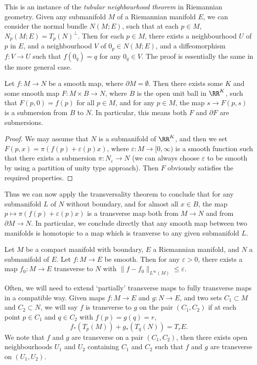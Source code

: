 \begin{remark}
    This is an instance of the \emph{tubular neighbourhood theorem} in Riemannian geometry. Given any submanifold $M$ of a Riemannian manifold $E$, we can consider the normal bundle $N(M;E)$, such that at each $p \in M$, $N_p(M;E) = T_p(N)^\perp$. Then for each $p \in M$, there exists a neighbourhood $U$ of $p$ in $E$, and a neighbourhood $V$ of $0_p \in N(M;E)$, and a diffeomorphism $f: V \to U$ such that $f(0_q) = q$ for any $0_q \in V$. The proof is essentially the same in the more general case.
\end{remark}

\begin{corollary}
    Let $f: M \to N$ be a smooth map, where $\partial M = \emptyset$. Then there exists some $K$ and some smooth map $F: M \times B \to N$, where $B$ is the open unit ball in $\RR^K$, such that $F(p,0) = f(p)$ for all $p \in M$, and for any $p \in M$, the map $s \to F(p,s)$ is a submersion from $B$ to $N$. In particular, this means both $F$ and $\partial F$ are submersions.
\end{corollary}
\begin{proof}
    We may assume that $N$ is a submanifold of $\RR^K$, and then we set $F(p,x) = \pi(f(p) + \varepsilon(p) x)$, where $\varepsilon: M \to [0,\infty)$ is a smooth function such that there exists a submersion $\pi: N_\varepsilon \to N$ (we can always choose $\varepsilon$ to be smooth by using a partition of unity type approach). Then $F$ obviously satisfies the required properties.
\end{proof}

Thus we can now apply the transversality theorem to conclude that for any submanifold $L$ of $N$ without boundary, and for almost all $x \in B$, the map $p \mapsto \pi(f(p) + \varepsilon(p) x)$ is a transverse map both from $M \to N$ and from $\partial M \to N$. In particular, we conclude directly that any smooth map between two manifolds is homotopic to a map which is tranverse to any given submanifold $L$.

\begin{corollary}
    Let $M$ be a compact manifold with boundary, $E$ a Riemannian manifold, and $N$ a submanifold of $E$. Let $f:M \to E$ be smooth. Then for any $\varepsilon > 0$, there exists a map $f_0: M \to E$ transverse to $N$ with $\| f - f_0 \|_{L^\infty(M)} \leq \varepsilon$.
\end{corollary}

Often, we will need to extend `partially' transverse maps to fully transverse maps in a compatible way. Given maps $f: M \to E$ and $g: N \to E$, and two sets $C_1 \subset M$ and $C_2 \subset N$, we will say $f$ is transverse to $g$ on the pair $(C_1,C_2)$ if at each point $p \in C_1$ and $q \in C_2$ with $f(p) = g(q) = r$,
%
\[ f_*(T_p(M)) + g_*(T_q(N)) = T_r E. \]
%
We note that $f$ and $g$ are transverse on a pair $(C_1,C_2)$, then there exists open neighbourhoods $U_1$ and $U_2$ containing $C_1$ and $C_2$ such that $f$ and $g$ are transverse on $(U_1,U_2)$.

